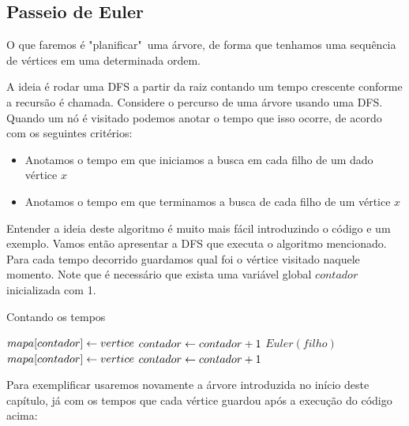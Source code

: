 \subsection{Passeio de Euler}

O que faremos é "planificar"\ uma árvore, de forma que tenhamos uma sequência de vértices em uma determinada ordem.

A ideia é rodar uma DFS a partir da raiz contando um tempo crescente conforme a recursão é chamada. Considere o percurso de uma árvore usando uma DFS. Quando um nó é visitado podemos anotar o tempo que isso ocorre, de acordo com os seguintes critérios:

\begin{itemize}
    \item Anotamos o tempo em que iniciamos a busca em cada filho de um dado vértice $x$
    \item Anotamos o tempo em que terminamos a busca de cada filho de um vértice $x$
\end{itemize}

Entender a ideia deste algoritmo é muito mais fácil introduzindo o código e um exemplo. Vamos então apresentar a DFS que executa o algoritmo mencionado. Para cada tempo decorrido guardamos qual foi o vértice visitado naquele momento. Note que é necessário que exista uma variável global $contador$ inicializada com 1.

\vspace{10cm}

\begin{algorithm}[H]
\caption{Contando os tempos}
\begin{algorithmic}[1]
        \State $mapa[contador] \leftarrow vertice$
        \State $contador \leftarrow contador + 1$
        \State $Euler(filho)$
    \EndFor
    \State $mapa[contador] \leftarrow vertice$
    \State $contador \leftarrow contador + 1$
\EndFunction
\end{algorithmic}
\end{algorithm}


Para exemplificar usaremos novamente a árvore introduzida no início deste capítulo, já com os tempos que cada vértice guardou após a execução do código acima:

\vspace{0.5cm}


